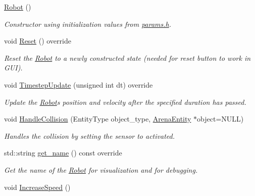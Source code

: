 \begin{DoxyCompactItemize}
\item 
\hyperlink{classRobot_a4fc7c70ae20623f05e06f2ecb388b6c4}{Robot} ()\hypertarget{classRobot_a4fc7c70ae20623f05e06f2ecb388b6c4}{}\label{classRobot_a4fc7c70ae20623f05e06f2ecb388b6c4}

\begin{DoxyCompactList}\small\item\em Constructor using initialization values from \hyperlink{params_8h}{params.\+h}. \end{DoxyCompactList}\item 
void \hyperlink{classRobot_af597fd14927d2cd5308ded62f4e54e29}{Reset} () override\hypertarget{classRobot_af597fd14927d2cd5308ded62f4e54e29}{}\label{classRobot_af597fd14927d2cd5308ded62f4e54e29}

\begin{DoxyCompactList}\small\item\em Reset the \hyperlink{classRobot}{Robot} to a newly constructed state (needed for reset button to work in G\+UI). \end{DoxyCompactList}\item 
void \hyperlink{classRobot_ae790462f8782efcfd26082eedec30ed5}{Timestep\+Update} (unsigned int dt) override
\begin{DoxyCompactList}\small\item\em Update the \hyperlink{classRobot}{Robot}\textquotesingle{}s position and velocity after the specified duration has passed. \end{DoxyCompactList}\item 
void \hyperlink{classRobot_a176a9958cc2ea1e585ddb2cdc82c0bdb}{Handle\+Collision} (Entity\+Type object\+\_\+type, \hyperlink{classArenaEntity}{Arena\+Entity} $\ast$object=N\+U\+LL)\hypertarget{classRobot_a176a9958cc2ea1e585ddb2cdc82c0bdb}{}\label{classRobot_a176a9958cc2ea1e585ddb2cdc82c0bdb}

\begin{DoxyCompactList}\small\item\em Handles the collision by setting the sensor to activated. \end{DoxyCompactList}\item 
std\+::string \hyperlink{classRobot_a3f77c13705b8f60480d21d8d936dc39e}{get\+\_\+name} () const override\hypertarget{classRobot_a3f77c13705b8f60480d21d8d936dc39e}{}\label{classRobot_a3f77c13705b8f60480d21d8d936dc39e}

\begin{DoxyCompactList}\small\item\em Get the name of the \hyperlink{classRobot}{Robot} for visualization and for debugging. \end{DoxyCompactList}\item 
void \hyperlink{classRobot_ae4647cccd002ca13659017e634237ead}{Increase\+Speed} ()\hypertarget{classRobot_ae4647cccd002ca13659017e634237ead}{}\label{classRobot_ae4647cccd002ca13659017e634237ead}


\end{DoxyCompactItemize}

